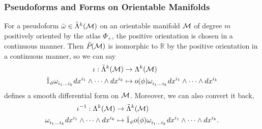 \documentclass[../main.tex]{subfiles}
\begin{document}
    \subsubsection{Pseudoforms and Forms on Orientable Manifolds}
    \begin{theorem}\label{thm:pseudo-to-form}
        For a pseudoform \(\pseudo{\omega} \in \pseudoform{k}{M}\) 
        on an orientable manifold \(\manifold[M]\) of degree \(m\) positively oriented 
        by the atlas \(\Phi_+\), the positive orientation is chosen in a continuous 
        manner. Then \(\pseudoscalar(\manifold[M])\) is isomorphic to \(\mathbb{R}\) 
        by the positive orientation in a continuous manner, so we can say
        \[
        \begin{aligned}
            \iota : \pseudoform{k}{M} &\to \form{k}{M} \\
            \pseudo{1}_\phi\omega\indices{_{i_1}_{\dots}_{i_k}}dx^{i_1}\wedge 
            \dots\wedge dx^{i_k} &\mapsto o(\phi)\omega\indices{_{i_1}_{\dots}_{i_k}}
            dx^{i_1}\wedge\dots\wedge dx^{i_k}
        \end{aligned}
        \]
        defines a smooth differential form on \(\manifold[M]\). Moreover, we can also 
        convert it back, 
        \[
        \begin{aligned}
            \iota ^{-1} : \form{k}{M} &\to  \pseudoform{k}{M}\\
            \omega\indices{_{i_1}_{\dots}_{i_k}}dx^{i_1}\wedge 
            \dots\wedge dx^{i_k} &\mapsto \pseudo{1}_\phi o(\phi)\omega\indices{_{i_1}_{\dots}_{i_k}}
            dx^{i_1}\wedge\dots\wedge dx^{i_k}.
        \end{aligned}
        \]
    \end{theorem}
\end{document}
